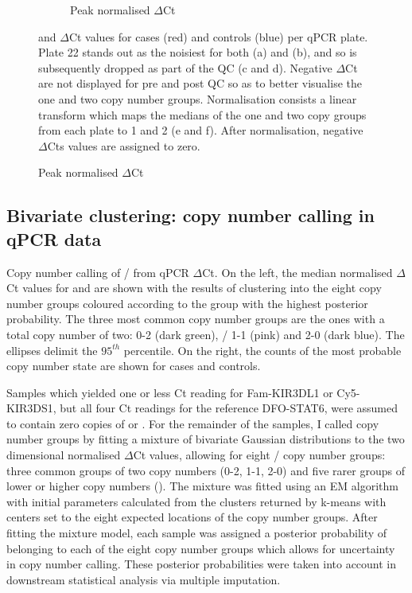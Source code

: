 \begin{figure}[!h]
\begin{subfigure}[b]{.4\textwidth}
    \caption{Peak normalised  $\Delta$Ct}
    \label{Figure-S1:f}
    \end{subfigure}
    {  and  $\Delta$Ct values for cases (red) and controls (blue) per qPCR plate.  }
    {
      Plate 22 stands out as the noisiest for both  (a) and  (b), and so is subsequently dropped as part of the QC (c and d).
      Negative $\Delta$Ct are not displayed for pre and post QC so as to better visualise the one and two copy number groups.
      Normalisation consists a linear transform which maps the medians of the one and two copy groups from each plate to 1 and 2 (e and f).
      After normalisation, negative $\Delta$Cts values are assigned to zero.
    }
\end{figure}

\subsection{Bivariate clustering: copy number calling in qPCR data}


{Copy number calling of / from qPCR $\Delta$Ct.}
{ On the left, the median normalised $\Delta$Ct values for  and
 are shown with the results of clustering into the eight
copy number groups coloured according to the group with the
highest posterior probability.  The three most common copy number groups are the
ones with a total copy number of two:  0-2 (dark green),
/ 1-1 (pink) and  2-0 (dark
blue).  The ellipses delimit the $95^{th}$ percentile.  On the right, the
counts of the most probable copy number state are shown for cases and
controls.}

Samples which yielded one or less Ct reading for Fam-KIR3DL1 or Cy5-KIR3DS1, but all four Ct readings for the reference DFO-STAT6, were assumed to contain zero copies of  or .  For the remainder of the samples, I called copy number groups by fitting a mixture of bivariate Gaussian distributions to the two dimensional normalised $\Delta$Ct values, allowing for eight / copy number groups: three common groups of two copy numbers (0-2, 1-1, 2-0) and five rarer groups of lower or higher copy numbers ().
The mixture was fitted using an \gls{EM} algorithm \citep{mixtools} with initial parameters calculated from the clusters returned by k-means with centers set to the eight expected locations of the copy number groups.
After fitting the mixture model, each sample was assigned a posterior probability of belonging to each of the eight copy number groups which allows for uncertainty in copy number calling.
These posterior probabilities were taken into account in downstream statistical analysis via multiple imputation.

